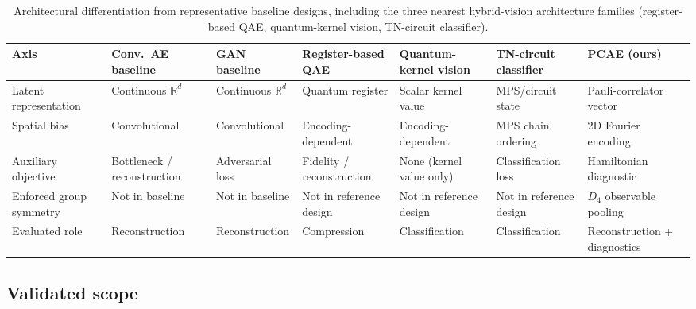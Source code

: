 \documentclass[pdflatex,sn-basic]{sn-jnl}
\begin{document}
\begin{table}[t]
  \centering
  \caption{Architectural differentiation from representative baseline designs,
           including the three nearest hybrid-vision architecture families
           (register-based QAE, quantum-kernel vision, TN-circuit classifier).}
  \label{tab:differentiation}
  \scriptsize
  \setlength{\tabcolsep}{3pt}
  \begin{tabularx}{\textwidth}{@{}L{0.13\textwidth} Y Y Y Y Y Y@{}}
    \toprule
    Axis
      & Conv.\ AE baseline
      & GAN baseline
      & Register-based QAE
      & Quantum-kernel vision
      & TN-circuit classifier
      & PCAE (ours) \\
    \midrule
    Latent representation
      & Continuous $\mathbb{R}^d$
      & Continuous $\mathbb{R}^d$
      & Quantum register
      & Scalar kernel value
      & MPS\slash circuit state
      & Pauli-correlator vector \\
    \addlinespace
    Spatial bias
      & Convolutional
      & Convolutional
      & Encoding-dependent
      & Encoding-dependent
      & MPS chain ordering
      & 2D Fourier encoding \\
    \addlinespace
    Auxiliary objective
      & Bottleneck / reconstruction
      & Adversarial loss
      & Fidelity / reconstruction
      & None (kernel value only)
      & Classification loss
      & Hamiltonian diagnostic \\
    \addlinespace
    Enforced group symmetry
      & Not in baseline
      & Not in baseline
      & Not in reference design
      & Not in reference design
      & Not in reference design
      & $D_4$ observable pooling \\
    \addlinespace
    Evaluated role
      & Reconstruction
      & Reconstruction
      & Compression
      & Classification
      & Classification
      & Reconstruction + diagnostics \\
    \bottomrule
  \end{tabularx}
\end{table}

\subsection{Validated scope}
\label{sec:limitations}
\end{document}
